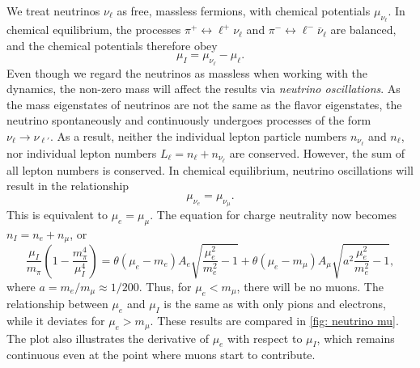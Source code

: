 We treat neutrinos $\nu_\ell$ as free, massless fermions, with chemical potentials $\mu_{\nu_\ell}$.
In chemical equilibrium, the processes $\pi^+ \leftrightarrow \ell^+ \nu_\ell $ and $\pi^- \leftrightarrow \ell^- \bar\nu_\ell $ are balanced, and the chemical potentials therefore obey
%
\begin{equation}
    \label{chemical equilibrium weak interaction}
    \mu_I = \mu_{\nu_\ell} - \mu_\ell.
\end{equation}
%
Even though we regard the neutrinos as massless when working with the dynamics, the non-zero mass will affect the results via \emph{neutrino oscillations}.
As the mass eigenstates of neutrinos are not the same as the flavor eigenstates, the neutrino spontaneously and continuously undergoes processes of the form $\nu_\ell \rightarrow \nu_{\ell'}$.
As a result, neither the individual lepton particle numbers $n_{\nu_\ell}$ and $n_{\ell}$, nor individual lepton numbers $L_\ell = n_\ell + n_{\nu_\ell}$ are conserved.
However, the sum of all lepton numbers is conserved.
In chemical equilibrium, neutrino oscillations will result in the relationship
%
\begin{equation}
    \mu_{\nu_e} = \mu_{\nu_\mu}.
\end{equation}
%
This is equivalent to $\mu_e = \mu_\mu$.
The equation for charge neutrality now becomes $n_I = n_e + n_\mu$, or
%
\begin{equation}
    \label{chemical potential relationship neutrinos}
    \frac{\mu_I}{m_\pi} \left(1 - \frac{m_\pi^4}{\mu_I^4}\right)
    =
    \theta(\mu_e - m_e) 
    A_e \sqrt{\frac{\mu_e^2}{m_e^2} - 1}
    +
    \theta(\mu_e - m_\mu)
    A_\mu \sqrt{a^2 \frac{\mu_e^2}{m_e^2} - 1},
\end{equation}
%
where $a = m_e/m_\mu \approx 1 / 200$.
Thus, for $\mu_e < m_\mu$, there will be no muons. 
The relationship between $\mu_e$ and $\mu_I$ is the same as with only pions and electrons, while it deviates for $\mu_e > m_\mu$.
These results are compared in \autoref{fig: neutrino mu}.
The plot also illustrates the derivative of $\mu_e$ with respect to $\mu_I$, which remains continuous even at the point where muons start to contribute.

